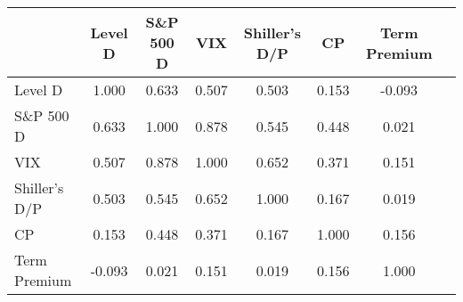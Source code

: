 \begin{tabular}{lccccccc}
\toprule
{} &  Level D &  S\&P 500 D &    VIX &  Shiller's D/P &     CP &  Term Premium \\
\midrule
Level D       &    1.000 &      0.633 &  0.507 &          0.503 &  0.153 &        -0.093 \\
S\&P 500 D     &    0.633 &      1.000 &  0.878 &          0.545 &  0.448 &         0.021 \\
VIX           &    0.507 &      0.878 &  1.000 &          0.652 &  0.371 &         0.151 \\
Shiller's D/P &    0.503 &      0.545 &  0.652 &          1.000 &  0.167 &         0.019 \\
CP            &    0.153 &      0.448 &  0.371 &          0.167 &  1.000 &         0.156 \\
Term Premium  &   -0.093 &      0.021 &  0.151 &          0.019 &  0.156 &         1.000 \\
\bottomrule
\end{tabular}
